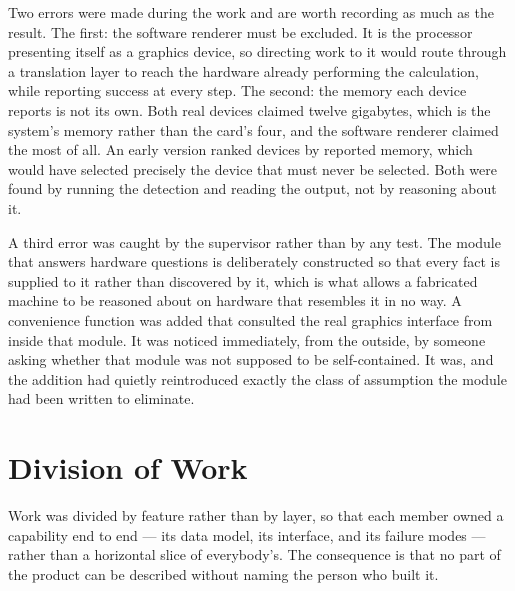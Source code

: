 \documentclass[11pt,a4paper]{article}
\begin{document}
Two errors were made during the work and are worth recording as much as the
result. The first: the software renderer must be excluded. It is the processor
presenting itself as a graphics device, so directing work to it would route
through a translation layer to reach the hardware already performing the
calculation, while reporting success at every step. The second: the memory each
device reports is not its own. Both real devices claimed twelve gigabytes, which
is the system's memory rather than the card's four, and the software renderer
claimed the most of all. An early version ranked devices by reported memory,
which would have selected precisely the device that must never be selected.
Both were found by running the detection and reading the output, not by
reasoning about it.

A third error was caught by the supervisor rather than by any test. The module
that answers hardware questions is deliberately constructed so that every fact
is supplied to it rather than discovered by it, which is what allows a
fabricated machine to be reasoned about on hardware that resembles it in no way.
A convenience function was added that consulted the real graphics interface from
inside that module. It was noticed immediately, from the outside, by someone
asking whether that module was not supposed to be self-contained. It was, and
the addition had quietly reintroduced exactly the class of assumption the module
had been written to eliminate.

\section{Division of Work}

Work was divided by feature rather than by layer, so that each member owned a
capability end to end --- its data model, its interface, and its failure modes
--- rather than a horizontal slice of everybody's. The consequence is that no
part of the product can be described without naming the person who built it.
\end{document}
